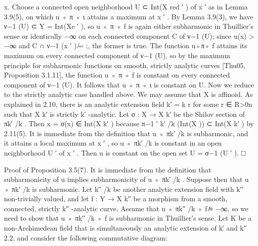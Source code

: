 \documentclass[
  10pt,
]{article}
\newenvironment{Shaded}{}{}
\newcommand{\NormalTok}[1]{#1}
\begin{document}
\begin{Shaded}
\begin{Highlighting}[]
\NormalTok{x. Choose a connected open neighborhood U ⊂ Int(X red                ′}
\NormalTok{                                                                       ) of x ′ as in Lemma 3.9(5), on}
\NormalTok{which u ◦ π ◦ ι attains a maximum at x ′ . By Lemma 3.9(3), we have ν−1 (U) ⊂ Y =}
\NormalTok{Int(Xe ′ ), so u ◦ π ◦ f is again either subharmonic in Thuillier’s sense or identically −∞}
\NormalTok{on each connected component C of ν−1 (U); since u(x) \textgreater{} −∞ and C ∩ ν−1 (x ′ ) ̸= ;, the}
\NormalTok{former is true. The function u◦π◦ f attains its maximum on every connected component}
\NormalTok{of ν−1 (U), so by the maximum principle for subharmonic functions on smooth, strictly}
\NormalTok{analytic curves [Thu05, Proposition 3.1.11], the function u ◦ π ◦ f is constant on every}
\NormalTok{connected component of ν−1 (U). It follows that u ◦ π ◦ ι is constant on U.}
\NormalTok{   Now we reduce to the strictly analytic case handled above. We may assume that X}
\NormalTok{is affinoid. As explained in 2.10, there is an analytic extension field k′ = k r for some}
\NormalTok{r ∈ R\textgreater{}0n}
\NormalTok{             such that X k′ is strictly k′ {-}analytic. Let σ : X → X k′ be the Shilov section of πk′ /k .}
\NormalTok{Then x = σ(x) ∈ Int(X k′ ) because π−1}
\NormalTok{           ′}
\NormalTok{                                                k′ /k}
\NormalTok{                                                      (Int(X )) ⊂ Int(X k′ ) by 2.11(5). It is immediate}
\NormalTok{from the definition that u ◦ πk′ /k is subharmonic, and it attains a local maximum at x ′ ,}
\NormalTok{so u ◦ πk′ /k is constant in an open neighborhood U ′ of x ′ . Then u is constant on the open}
\NormalTok{set U = σ−1 (U ′ ).                                                                                   □}

\NormalTok{Proof of Proposition 3.5(7). It is immediate from the definition that subharmonicity of}
\NormalTok{u implies subharmonicity of u ◦ πk′ /k . Suppose then that u ◦ πk′ /k is subharmonic. Let}
\NormalTok{k′′ /k be another analytic extension field with k′′ non{-}trivially valued, and let f : Y →}
\NormalTok{X k′′ be a morphism from a smooth, connected, strictly k′′ {-}analytic curve. Assume that}
\NormalTok{u ◦ πk′′ /k ◦ f ̸≡ −∞, so we need to show that u ◦ πk′′ /k ◦ f is subharmonic in Thuillier’s}
\NormalTok{sense. Let K be a non{-}Archimedean field that is simultaneously an analytic extension of}
\NormalTok{k′ and k′′ 2.2, and consider the following commutative diagram:}


\end{Highlighting}
\end{Shaded}
\end{document}
